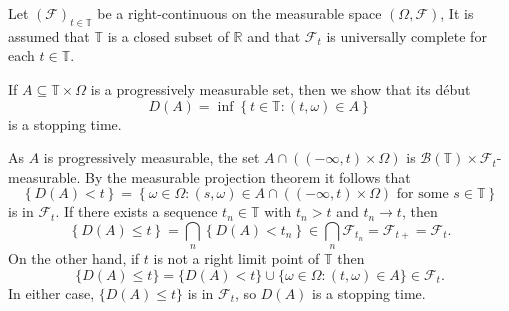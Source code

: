 \documentclass[12pt]{article}
\begin{document}

Let $(\mathcal{F})_{t\in\mathbb{T}}$ be a right-continuous  on the measurable space $(\Omega,\mathcal{F})$, It is assumed that $\mathbb{T}$ is a closed subset of $\mathbb{R}$ and that $\mathcal{F}_t$ is universally complete for each $t\in\mathbb{T}$.

If $A\subseteq\mathbb{T}\times\Omega$ is a progressively measurable set, then we show that its d\'ebut
\begin{equation*}
D(A)=\inf\left\{t\in\mathbb{T}:(t,\omega)\in A\right\}
\end{equation*}
is a stopping time.

As $A$ is progressively measurable, the set $A\cap((-\infty,t)\times\Omega)$ is $\mathcal{B}(\mathbb{T})\times\mathcal{F}_t$-measurable. By the measurable projection theorem it follows that
\begin{equation*}
\left\{D(A)<t\right\}=\left\{\omega\in\Omega:(s,\omega)\in A\cap((-\infty,t)\times\Omega)\textrm{ for some }s\in\mathbb{T}\right\}
\end{equation*}
is in $\mathcal{F}_t$. If there exists a sequence $t_n\in\mathbb{T}$ with $t_n>t$ and $t_n\rightarrow t$, then
\begin{equation*}
\left\{D(A)\le t\right\}=\bigcap_n\left\{D(A)<t_n\right\}\in\bigcap_n\mathcal{F}_{t_n}=\mathcal{F}_{t+}=\mathcal{F}_t.
\end{equation*}
On the other hand, if $t$ is not a right limit point of $\mathbb{T}$ then
\begin{equation*}
\{D(A)\le t\}=\{D(A)<t\}\cup\{\omega\in\Omega:(t,\omega)\in A\}\in\mathcal{F}_t.
\end{equation*}
In either case, $\{D(A)\le t\}$ is in $\mathcal{F}_t$, so $D(A)$ is a stopping time.

\end{document}
